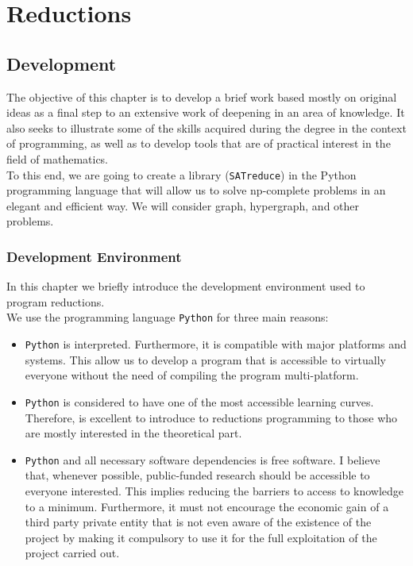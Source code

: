 \part{Reductions} %

\label{chap:3}


\chapter{Development}

The objective of this chapter is to develop a brief work based mostly on original ideas as a final step to an extensive work of deepening in an area of knowledge. It also seeks to illustrate some of the skills acquired during the degree in the context of programming, as well as to develop tools that are of practical interest in the field of mathematics. \\

To this end, we are going to create a library (\texttt{SATreduce}) in the Python  programming language that will allow us to solve np-complete problems in an elegant and efficient way.  We will consider graph, hypergraph, and other problems. 

\section{Development Environment}

In this chapter we briefly introduce the development environment used to program reductions.\\

We use the programming language \texttt{Python} for three main reasons:

\begin{itemize}
\item \texttt{Python} is interpreted. Furthermore, it is compatible with major platforms and systems. This allow us to develop a program that is accessible to virtually everyone without the need of compiling the program multi-platform. 

\item \texttt{Python} is considered to have one of the most accessible learning curves. Therefore, is excellent to introduce to reductions programming to those who are mostly interested in the theoretical part.

\item \texttt{Python}  and all necessary software dependencies is  free software\cite{stallman2002free}. I believe that, whenever possible, public-funded research should be accessible to everyone interested. This implies reducing the barriers to access to knowledge to a minimum.  Furthermore, it must not encourage the economic gain of a third party private entity that is not even aware of the existence of the project by making it compulsory to use it for the full exploitation of the project carried out.
\end{itemize}



